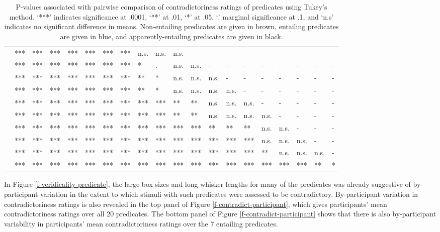 \documentclass[11pt,fleqn]{article}
\newcommand{\6}{\mbox{$[\hspace*{-.6mm}[$}}
\newcommand{\9}{\mbox{$]\hspace*{-.6mm}]$}}
\begin{document}
\begin{landscape}
\begin{table}[h!]
\begin{tabular}{l l l l l l l l l l l l l l l l l l l l }
\color{black}{\em acknowledge}\color{black}	& *** & *** & *** & *** & *** & *** & *** & n.s. & n.s. & n.s. & - & - & - & - & - & - & - & - & - \\
\color{black}{\em admit}\color{black}			& *** & *** & *** & *** & *** & *** & *** & * & . & n.s. & n.s. & - & - & - & - & - & - & - & - \\
\color{blue}{\em establish}\color{black}		& *** & *** & *** & *** & *** & *** & *** & ** & * & n.s. & n.s. &  n.s. & - & - & - & - & - & - & - \\
\color{black}{\em demonstrate}\color{black}	& *** & *** & *** & *** & *** & *** & *** & ** & * & n.s. & n.s. & n.s. & n.s. & - & - & - & - & - & - \\
\color{black}{\em confirm}\color{black}		& *** & *** & *** & *** & *** & *** & *** & *** & *** & ** & ** & n.s. & n.s. & n.s. & - & - & - & - & - \\
\color{blue}{\em discover}\color{black}		& *** & *** & *** & *** & *** & *** & *** & *** & *** & ** & ** & n.s. & n.s. & n.s. & n.s. & - & - & - & - \\
\color{blue}{\em see}\color{black}			& *** & *** & *** & *** & *** & *** & *** & *** & *** & *** & *** & ** & ** & ** & n.s. & n.s. & - & - & - \\
\color{blue}{\em know}\color{black}			& *** & *** & *** & *** & *** & *** & *** & *** & *** & *** & *** & *** & *** & *** & n.s. & n.s. & n.s. & - & - \\
\color{black}{\em prove}\color{black}			& *** & *** & *** & *** & *** & *** & *** & *** & *** & *** & *** & *** & *** & *** & ** & n.s. & n.s. & n.s. & -  \\
\color{blue}{\em be right}\color{black}		& *** & *** & *** & *** & *** & *** & *** & *** & ***  & ***  & *** & *** & *** & *** & *** & *** & *** & ** & *  \\

\bottomrule
\end{tabular}
\caption{P-values associated with pairwise comparison of contradictoriness ratings of predicates using Tukey's method. `***' indicates significance at .0001, `**' at .01, `*' at .05, `.' marginal significance at .1, and `n.s' indicates no significant difference in means. Non-entailing predicates are given in brown, entailing predicates are given in blue, and apparently-entailing predicates are given in black.}\label{t-pairwise}
\end{table}
\end{landscape}

In Figure \ref{f-veridicality-predicate}, the large box sizes and long whisker lengths for many of the predicates was already suggestive of by-participant variation in the extent to which stimuli with such predicates were assessed to be contradictory. By-participant variation in contradictoriness ratings is also revealed in the top panel of Figure \ref{f-contradict-participant}, which gives participants' mean contradictoriness ratings over all 20 predicates. The bottom panel of Figure \ref{f-contradict-participant} shows that there is also by-participant variability in participants' mean contradictoriness ratings over the 7 entailing predicates.
\end{document}
